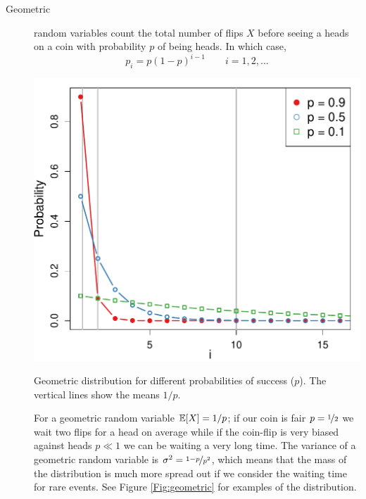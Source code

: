 \begin{description}
\item[Geometric] random variables count the total number of flips $X$ before seeing a heads on a coin with probability $p$ of being heads. In which case, 
\begin{equation}
p_i =p (1-p)^{i-1} \qquad i=1,2,\dots
\end{equation}
    \begin{marginfigure}
 \begin{center}
   \includegraphics[width=\textwidth]{math_background/dist_pics/Geometric.pdf}\end{center}
 \caption{Geometric distribution for different probabilities of
   success ($p$). The vertical lines show the means $1/p$. }\label{Fig:geometric}
 \end{marginfigure}
For a geometric random variable $\mathbb{E}[X]=1/p$; if our coin is fair
$p=\nicefrac{1}{2}$ we wait two flips for a head on average while if
the coin-flip is very biased against heads $p \ll 1$ we can be waiting
a very long time. The variance of a
geometric random variable is $\sigma^2 =\nicefrac{1-p}{p^2}$, which
means that the mass of the distribution is much more spread out if we
consider the waiting time for rare events. See Figure
\ref{Fig:geometric} for examples of the distribution. 


\end{description}
